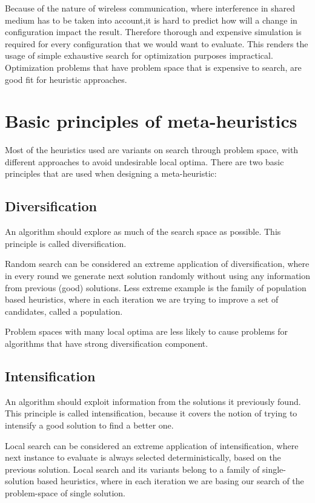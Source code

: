 \documentclass[12pt,oneside]{fithesis2}
\begin{document}
Because of the nature of wireless communication, where interference in shared medium has to be taken into account,it is hard to predict how will a change in configuration impact the result. Therefore thorough and expensive simulation is required for every configuration that we would want to evaluate. This renders the usage of simple exhaustive search for optimization purposes impractical. Optimization problems that have problem space that is expensive to search, are good fit for heuristic approaches\cite{talbi2009metaheuristics}. 

\section{Basic principles of meta-heuristics}

Most of the heuristics used are variants on search through problem space, with different approaches to avoid undesirable local optima.
There are two basic principles that are used when designing a meta-heuristic\cite{talbi2009metaheuristics}:

\subsection{Diversification}
An algorithm should explore as much of the search space as possible. This principle is called diversification.

Random search can be considered an extreme application of diversification, where in every round we generate next solution randomly without using any information from previous (good) solutions. Less extreme example is the family of population based heuristics, where in each iteration we are trying to improve a set of candidates, called a population.

Problem spaces with many local optima are less likely to cause problems for algorithms that have strong diversification component.

\subsection{Intensification} 
An algorithm should exploit information from the solutions it previously found. This principle is called intensification, because it covers the notion of trying to intensify a good solution to find a better one.

Local search can be considered an extreme application of intensification, where next instance to evaluate is always selected deterministically, based on the previous solution. Local search and its variants belong to a family of single-solution based heuristics, where in each iteration we are basing our search of the problem-space of single solution.
\end{document}
